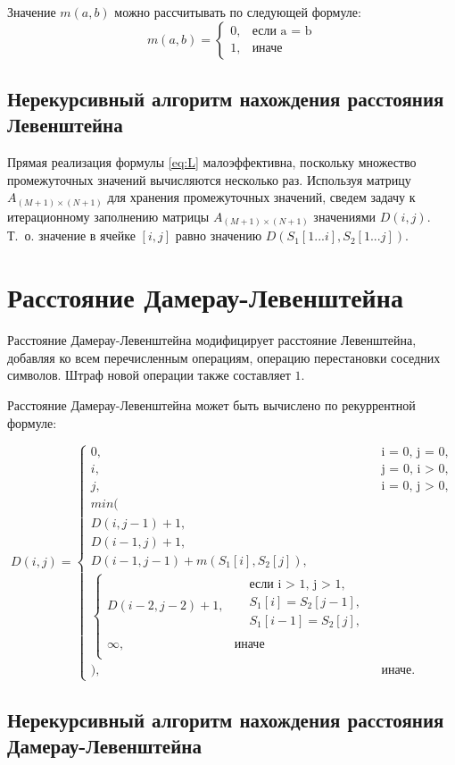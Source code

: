 Значение $ m(a, b) $ можно рассчитывать по следующей формуле:
\begin{equation}
	m(a, b) = \begin{cases}
		0, &\text{если a = b}\\
		1, &\text{иначе}
	\end{cases}
\end{equation}

\subsection{Нерекурсивный алгоритм нахождения расстояния Левенштейна}

Прямая реализация формулы \ref{eq:L} малоэффективна, поскольку множество промежуточных значений вычисляются несколько раз. Используя матрицу $ A_{(M+1) \times (N+1)} $ для хранения промежуточных значений, сведем задачу к итерационному заполнению матрицы $ A_{(M+1) \times (N+1)} $ значениями $ D(i, j) $. Т.~о. значение в ячейке $ [i, j] $ равно значению $ D(S_1[1...i], S_2[1...j]) $.

\section{Расстояние Дамерау-Левенштейна}

Расстояние Дамерау-Левенштейна модифицирует расстояние Левенштейна, добавляя ко всем перечисленным операциям, операцию перестановки соседних символов. Штраф новой операции также составляет $ 1 $. 

Расстояние Дамерау-Левенштейна может быть вычислено по рекуррентной формуле:

\begin{equation}
	\label{eq:DL}
	D(i, j) = 
	\begin{cases}
		0, &\text{i = 0, j = 0,}\\
		i, &\text{j = 0, i > 0,}\\
		j, &\text{i = 0, j > 0,}\\
		min(\\
			D(i, j - 1) + 1,\\
			D(i - 1, j) + 1,\\ 
			D(i - 1, j - 1) + m(S_{1}[i], S_{2}[j]), \\
			\begin{cases}
				D(i - 2, j - 2) + 1, & \begin{aligned}
					& \text{если i > 1, j > 1}, \\
					& S_{1}[i] = S_{2}[j - 1], \\
					& S_{1}[i - 1] = S_{2}[j], \\
				\end{aligned}\\
				\infty, & \textrm{иначе} \\
			\end{cases} \\
		), & \textrm{иначе.}
	\end{cases}
\end{equation}

\subsection{Нерекурсивный алгоритм нахождения расстояния Дамерау-Левенштейна}